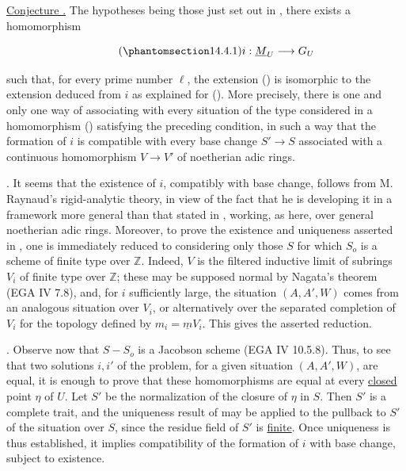 \par\medskip
\noindent
\underline{Conjecture .}  The hypotheses being those just set out in
, there exists a homomorphism

\begin{equation}\tag{\SGARefTarget{sga7.sga7i.eix.n14-4-1}{14.4.1}}
 i:\underline M_U\longrightarrow G_U
\end{equation}

\noindent
such that, for every prime number $\ell$, the extension () is
isomorphic to the extension deduced from $i$ as explained for ().
More precisely, there is one and only one way of associating with every
situation of the type considered in  a homomorphism ()
satisfying the preceding condition, in such a way that the formation of
$i$ is compatible with every base change $S'\longrightarrow S$
associated with a continuous homomorphism $V\longrightarrow V'$ of
noetherian adic rings.

\medskip
\noindent
{}. It seems that the existence of $i$, compatibly with base change,
follows from M. Raynaud's rigid-analytic theory, in view of the fact that
he is developing it in a framework more general than that stated in
, working, as here, over general noetherian adic rings.  Moreover,
to prove the existence and uniqueness asserted in , one is
immediately reduced to considering only those $S$ for which $S_o$ is a
scheme of finite type over $\mathbb Z$.  Indeed, $V$ is the filtered
inductive limit of subrings $V_i$ of finite type over $\mathbb Z$; these
may be supposed normal by Nagata's theorem (EGA IV 7.8), and, for $i$
sufficiently large, the situation $(A,A',W)$ comes from an analogous
situation over $V_i$, or alternatively over the separated completion of
$V_i$ for the topology defined by $m_i=\underline m V_i$.  This gives
the asserted reduction.

\medskip
\noindent
{}. Observe now that $S-S_o$ is a Jacobson scheme (EGA IV 10.5.8).
Thus, to see that two solutions $i,i'$ of the problem, for a given
situation $(A,A',W)$, are equal, it is enough to prove that these
homomorphisms are equal at every \underline{closed} point $\eta$ of
$U$.  Let $S'$ be the normalization of the closure of $\eta$ in $S$.
Then $S'$ is a complete trait, and the uniqueness result of  may be
applied to the pullback to $S'$ of the situation over $S$, since the
residue field of $S'$ is \underline{finite}.  Once uniqueness is thus
established, it implies compatibility of the formation of $i$ with base
change, subject to existence.


